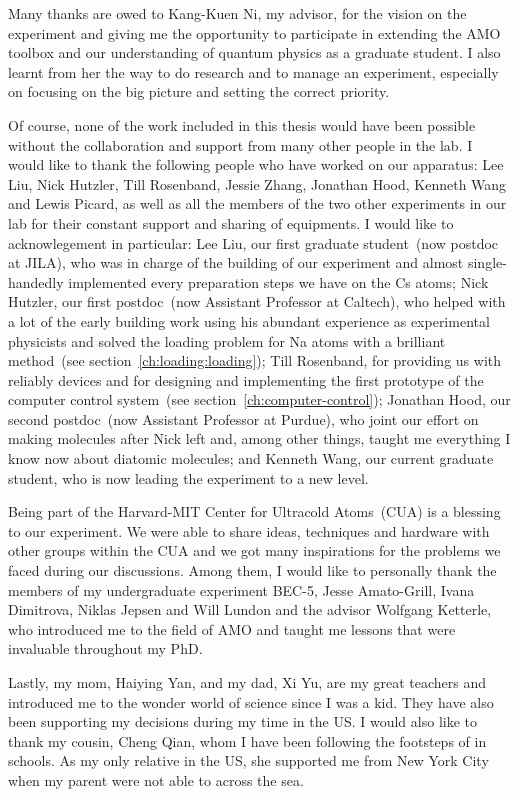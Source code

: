 
Many thanks are owed to Kang-Kuen Ni, my advisor,
for the vision on the experiment and giving me the opportunity
to participate in extending the AMO toolbox and our understanding of quantum physics
as a graduate student.
I also learnt from her the way to do research and to manage an experiment,
especially on focusing on the big picture and setting the correct priority.

Of course, none of the work included in this thesis would have been possible
without the collaboration and support from many other people in the lab.
I would like to thank the following people who have worked on our apparatus:
Lee Liu, Nick Hutzler, Till Rosenband, Jessie Zhang,
Jonathan Hood, Kenneth Wang and Lewis Picard,
as well as all the members of the two other experiments in our lab
for their constant support and sharing of equipments.
I would like to acknowlegement in particular:
Lee Liu, our first graduate student~(now postdoc at JILA),
who was in charge of the building of our experiment and almost single-handedly implemented
every preparation steps we have on the Cs atoms;
Nick Hutzler, our first postdoc~(now Assistant Professor at Caltech),
who helped with a lot of the early building work using his abundant experience
as experimental physicists and solved the loading problem for Na atoms
with a brilliant method~(see section~\ref{ch:loading:loading});
Till Rosenband, for providing us with reliably devices
and for designing and implementing the first prototype
of the computer control system~(see section~\ref{ch:computer-control});
Jonathan Hood, our second postdoc~(now Assistant Professor at Purdue),
who joint our effort on making molecules after Nick left and, among other things,
taught me everything I know now about diatomic molecules;
and Kenneth Wang, our current graduate student,
who is now leading the experiment to a new level.

Being part of the Harvard-MIT Center for Ultracold Atoms~(CUA) is a blessing to our experiment.
We were able to share ideas, techniques and hardware with other groups within the CUA
and we got many inspirations for the problems we faced during our discussions.
Among them, I would like to personally thank the members of my undergraduate experiment BEC-5,
Jesse Amato-Grill, Ivana Dimitrova, Niklas Jepsen and Will Lundon
and the advisor Wolfgang Ketterle, who introduced me to the field of AMO
and taught me lessons that were invaluable throughout my PhD.

Lastly, my mom, Haiying Yan, and my dad, Xi Yu, are my great teachers
and introduced me to the wonder world of science since I was a kid.
They have also been supporting my decisions during my time in the US.
I would also like to thank my cousin, Cheng Qian,
whom I have been following the footsteps of in schools.
As my only relative in the US, she supported me from New York City
when my parent were not able to across the sea.
